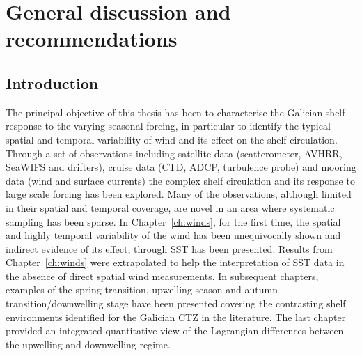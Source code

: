 \chapter{General discussion and
recommendations}\label{ch:conclusions}
\section{Introduction}

The principal objective of this thesis has been to characterise
the Galician shelf response to the varying seasonal forcing, in
particular to identify the typical spatial and temporal
variability of wind and its effect on the shelf circulation.
Through a set of observations including satellite data
(scatterometer, AVHRR, SeaWIFS and drifters), cruise data (CTD,
ADCP, turbulence probe) and mooring data (wind and surface
currents) the complex shelf circulation and its response to large
scale forcing has been explored. Many of the observations,
although limited in their spatial and temporal coverage, are novel
in an area where systematic sampling has been sparse. In
Chapter~\ref{ch:winds}, for the first time, the spatial and highly
temporal variability of the wind has been unequivocally shown and
indirect evidence of its effect, through SST has been presented.
Results from Chapter~\ref{ch:winds} were extrapolated to help the
interpretation of SST data in the absence of direct spatial wind
measurements. In subsequent chapters, examples of the spring
transition, upwelling season and autumn transition/downwelling
stage have been presented covering the contrasting shelf
environments identified for the Galician CTZ in the literature.
The last chapter provided an integrated quantitative view of the
Lagrangian differences between the upwelling and downwelling
regime.

